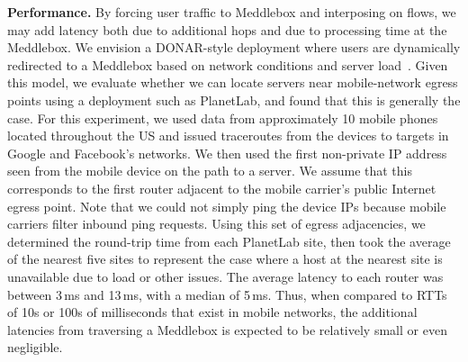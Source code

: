 \documentclass{sig-alternate-10pt}
\newcommand{\meddlebox}{{Meddlebox}\xspace}
\begin{document}
\noindent\textbf{Performance.} By forcing user traffic to \meddlebox 
and interposing on flows, we may add latency both due to additional
hops and due to processing time at the \meddlebox. We envision a
DONAR-style deployment where users are dynamically redirected to a
\meddlebox based on network conditions and server
load~\cite{wendell:donar}. Given this model, we evaluate whether we
can locate servers near mobile-network egress points using a
deployment such as PlanetLab, and found that this is generally the
case. For this experiment, we used data from approximately 10 mobile
phones located throughout the US and issued traceroutes from the
devices to targets in Google and Facebook's networks. We then used the
first non-private IP address seen from the mobile device on the path
to a server. We assume that this corresponds to the first router
adjacent to the mobile carrier's public Internet egress point. Note
that we could not simply ping the device IPs because mobile carriers
filter inbound ping requests. Using this set of egress adjacencies, we
determined the round-trip time from each PlanetLab site, then took the
average of the nearest five sites to represent the case where a host
at the nearest site is unavailable due to load or other issues. The
average latency to each router was between 3\,ms and 13\,ms, with a
median of 5\,ms. Thus, when compared to RTTs of 10s or 100s of
milliseconds that exist in mobile networks, the additional latencies
from traversing a \meddlebox is expected to be relatively small or
even negligible.

\scriptsize


\normalsize
\end{document}
